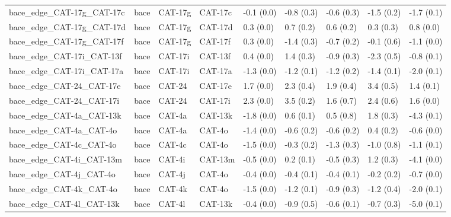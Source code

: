 \begin{tabular}{lllllllll}
bace\_edge\_CAT-17g\_CAT-17c        &      bace &     CAT-17g &     CAT-17c &  -0.1 (0.0) &        -0.8 (0.3) &  -0.6 (0.3) &  -1.5 (0.2) &  -1.7 (0.1) \\
bace\_edge\_CAT-17g\_CAT-17d        &      bace &     CAT-17g &     CAT-17d &   0.3 (0.0) &         0.7 (0.2) &   0.6 (0.2) &   0.3 (0.3) &   0.8 (0.0) \\
bace\_edge\_CAT-17g\_CAT-17f        &      bace &     CAT-17g &     CAT-17f &   0.3 (0.0) &        -1.4 (0.3) &  -0.7 (0.2) &  -0.1 (0.6) &  -1.1 (0.0) \\
bace\_edge\_CAT-17i\_CAT-13f        &      bace &     CAT-17i &     CAT-13f &   0.4 (0.0) &         1.4 (0.3) &  -0.9 (0.3) &  -2.3 (0.5) &  -0.8 (0.1) \\
bace\_edge\_CAT-17i\_CAT-17a        &      bace &     CAT-17i &     CAT-17a &  -1.3 (0.0) &        -1.2 (0.1) &  -1.2 (0.2) &  -1.4 (0.1) &  -2.0 (0.1) \\
bace\_edge\_CAT-24\_CAT-17e         &      bace &      CAT-24 &     CAT-17e &   1.7 (0.0) &         2.3 (0.4) &   1.9 (0.4) &   3.4 (0.5) &   1.4 (0.1) \\
bace\_edge\_CAT-24\_CAT-17i         &      bace &      CAT-24 &     CAT-17i &   2.3 (0.0) &         3.5 (0.2) &   1.6 (0.7) &   2.4 (0.6) &   1.6 (0.0) \\
bace\_edge\_CAT-4a\_CAT-13k         &      bace &      CAT-4a &     CAT-13k &  -1.8 (0.0) &         0.6 (0.1) &   0.5 (0.8) &   1.8 (0.3) &  -4.3 (0.1) \\
bace\_edge\_CAT-4a\_CAT-4o          &      bace &      CAT-4a &      CAT-4o &  -1.4 (0.0) &        -0.6 (0.2) &  -0.6 (0.2) &   0.4 (0.2) &  -0.6 (0.0) \\
bace\_edge\_CAT-4c\_CAT-4o          &      bace &      CAT-4c &      CAT-4o &  -1.5 (0.0) &        -0.3 (0.2) &  -1.3 (0.3) &  -1.0 (0.8) &  -1.1 (0.1) \\
bace\_edge\_CAT-4i\_CAT-13m         &      bace &      CAT-4i &     CAT-13m &  -0.5 (0.0) &         0.2 (0.1) &  -0.5 (0.3) &   1.2 (0.3) &  -4.1 (0.0) \\
bace\_edge\_CAT-4j\_CAT-4o          &      bace &      CAT-4j &      CAT-4o &  -0.4 (0.0) &        -0.4 (0.1) &  -0.4 (0.1) &  -0.2 (0.2) &  -0.7 (0.0) \\
bace\_edge\_CAT-4k\_CAT-4o          &      bace &      CAT-4k &      CAT-4o &  -1.5 (0.0) &        -1.2 (0.1) &  -0.9 (0.3) &  -1.2 (0.4) &  -2.0 (0.1) \\
bace\_edge\_CAT-4l\_CAT-13k         &      bace &      CAT-4l &     CAT-13k &  -0.4 (0.0) &        -0.9 (0.5) &  -0.6 (0.1) &  -0.7 (0.3) &  -5.0 (0.1) \\

\end{tabular}
